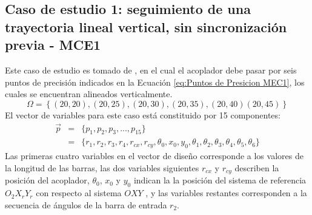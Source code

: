 \subsection{Caso de estudio 1: seguimiento de una trayectoria lineal vertical, sin
sincronización previa - MCE1}
Este caso de estudio es tomado de \cite{VegaMEC1}, en el cual el acoplador debe pasar por
seis puntos de precisión indicados en la Ecuación \ref{eq:Puntos de Presicion MEC1}, los cuales se encuentran alineados verticalmente.
\begin{equation}\label{eq:Puntos de Presicion MEC1}
\Omega = \left \{ (20, 20), (20, 25), (20, 30), (20, 35), (20, 40) (20, 45)\right\} 
\end{equation}
El vector de variables para este caso está constituido por 15 componentes:
\begin{eqnarray}\label{eq:Vector variables MEC1}
\vec{p} &=& \{p_1,p_2,p_3,...,p_{15} \}\\
       &=& \{ r_1,r_2,r_3,r_4,r_{cx},r_{cy},\theta_0,x_0,y_0,\theta_1,\theta_2,\theta_3,\theta_4,\theta_5,\theta_6 \} 
\end{eqnarray}
Las primeras cuatro variables en el vector de diseño corresponde a los valores de la longitud de las barras, las dos variables siguientes $r_{cx}$ y $r_{cy}$ describen la posición del acoplador, $\theta_0$, $x_0$ y $y_0$ indican la la posición del sistema de referencia $O_2X_rY_r$ con respecto al sistema $OXY$ , y las variables restantes corresponden a la secuencia de ángulos de la barra de entrada $r_2$.

